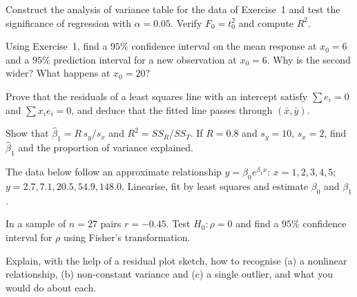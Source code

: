 \begin{exercise}
Construct the analysis of variance table for the data of Exercise~1 and test the significance of regression with $\alpha=0.05$. Verify $F_0=t_0^2$ and compute $R^2$.
\end{exercise}

\begin{exercise}
Using Exercise~1, find a $95\%$ confidence interval on the mean response at $x_0=6$ and a $95\%$ prediction interval for a new observation at $x_0=6$. Why is the second wider? What happens at $x_0=20$?
\end{exercise}

\begin{exercise}
Prove that the residuals of a least squares line with an intercept satisfy $\sum e_i=0$ and $\sum x_ie_i=0$, and deduce that the fitted line passes through $(\bar{x},\bar{y})$.
\end{exercise}

\begin{exercise}
Show that $\hat\beta_1=R\,s_y/s_x$ and $R^2=SS_R/SS_T$. If $R=0.8$ and $s_y=10$, $s_x=2$, find $\hat\beta_1$ and the proportion of variance explained.
\end{exercise}

\begin{exercise}
The data below follow an approximate relationship $y=\beta_0e^{\beta_1x}$: $x=1,2,3,4,5$; $y=2.7,7.1,20.5,54.9,148.0$. Linearise, fit by least squares and estimate $\beta_0$ and $\beta_1$.
\end{exercise}

\begin{exercise}
In a sample of $n=27$ pairs $r=-0.45$. Test $H_0:\rho=0$ and find a $95\%$ confidence interval for $\rho$ using Fisher's transformation.
\end{exercise}

\begin{exercise}
Explain, with the help of a residual plot sketch, how to recognise (a) a nonlinear relationship, (b) non-constant variance and (c) a single outlier, and what you would do about each.
\end{exercise}
